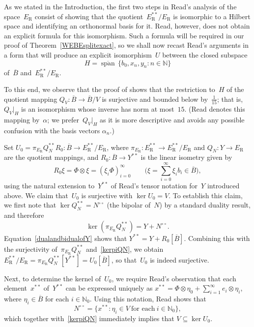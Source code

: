 \documentclass[12pt,reqno]{amsart}
\theoremstyle{definition}
\numberwithin{equation}{section}
\newcommand{\N}{\mathbb{N}}
\newcommand{\clspa}{\overline{\operatorname{span}}\,}
\begin{document}
As we stated in the Introduction, the first two steps in Read's analysis
of the space~$E_{\text{R}}$ consist of showing that the
quotient~$E_{\text{R}}^{**}/E_{\text{R}}$ is isomorphic to a Hilbert
space and identifying an orthonormal basis for it. Read, however, does
not obtain an explicit formula for this isomorphism. Such a formula
will be required in our proof of Theorem~\ref{WEBEsplitexact}, so we
shall now recast Read's arguments in a form that will produce an
explicit isomorphism~$U$ between the closed subspace
\begin{equation}\label{defnH} H = \clspa\{b_0,x_n,y_n :
n\in\N\} \end{equation} of~$\overline{B}$ 
and~$E_{\text{R}}^{**}/E_{\text{R}}$.

To this end, we observe that the proof of \cite[Lemma~3.7]{read} shows
that the restriction to~$H$ of the quotient mapping
$Q_V\colon\overline{B}\to\overline{B}/V$ is surjective and bounded
below by~$\frac{1}{15}$; that is, $Q_V|_H$ is an isomorphism whose
inverse has norm at most~$15$. (Read denotes this mapping by~$\alpha$;
we prefer~$Q_V|_H$ as it is more descriptive and avoids any possible
confusion with the basis vectors $\alpha_n$.)

Set $U_0 = \pi_{E_{\text{R}}}Q_N^{**}R_0\colon \overline{B}\to
E^{**}_{\text{R}}/E_{\text{R}}$, where \mbox{$\pi_{E_{\text{R}}}\colon
  E^{**}_{\text{R}}\to E^{**}_{\text{R}}/E_{\text{R}}$} and $Q_N\colon
Y\to E_{\text{R}}$ are the quotient mappings, and
$R_0\colon\overline{B}\to Y^{**}$ is the linear isometry given by
\[ R_0\xi = \Phi\otimes\xi = (\xi_i\Phi)_{i=0}^\infty\qquad \biggl(\xi =
\sum_{i=0}^\infty\xi_i b_i\in\overline{B}\biggr), \] using the natural
extension to~$Y^{**}$ of Read's tensor notation for~$Y$ introduced
above. We claim that~$U_0$ is surjective with $\ker U_0 = V$.  To
establish this claim, we first note that $\ker Q_N^{**} =
N^{\circ\circ}$ (the bipolar of~$N$) by a standard duality result, and
therefore \begin{equation}\label{kerpiQN} \ker
  (\pi_{E_{\text{R}}}Q_N^{**}) = Y+N^{\circ\circ}.
\end{equation}
Equation~\eqref{dualandbidualofY} shows that $Y^{**} =
Y+R_0[\overline{B}]$. Combining this with the surjectivity
of~$\pi_{E_{\text{R}}}Q_N^{**}$ and~\eqref{kerpiQN}, we obtain
$E_{\text{R}}^{**}/E_{\text{R}} = \pi_{E_{\text{R}}}Q_N^{**}[Y^{**}] =
U_0[\overline{B}]$, so that~$U_0$ is indeed surjective.

Next, to determine the kernel of~$U_0$, we require Read's observation
\cite[equation~(3.6.3)]{read} that each element~$x^{**}$ of~$Y^{**}$
can be expressed uniquely as $x^{**} = \Phi\otimes\eta_0 +
\sum_{i=1}^\infty e_i\otimes\eta_i$, where $\eta_i\in\overline{B}$
for each $i\in\N_0$.  Using this notation, Read
\cite[Lemma~3.6.4]{read} shows that
\begin{equation}\label{bipolarN} 
  N^{\circ\circ} = \{ x^{**}:
\eta_i\in V\ \text{for each}\ i\in\N_0\}, \end{equation}
which together with~\eqref{kerpiQN}
immediately implies that $V\subseteq\ker U_0$.  
\end{document}

